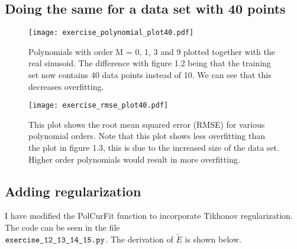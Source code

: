 \documentclass[paper=a4, fontsize=10pt]{scrartcl} %
\numberwithin{equation}{section} %
\numberwithin{figure}{section} %
\numberwithin{table}{section} %
\begin{document}
\subsection{Doing the same for a data set with 40 points}
\begin{figure}[H]
	\centering
	\texttt{[image: exercise\_polynomial\_plot40.pdf]}
	\caption{Polynomials with order M = 0, 1, 3 and 9 plotted together with the real sinusoid. The difference with figure 1.2 being that the training set now contains 40 data points instead of 10. We can see that this decreases overfitting.}
\end{figure}

\begin{figure}[H]
	\centering
	\texttt{[image: exercise\_rmse\_plot40.pdf]}
	\caption{This plot shows the root mean squared error (RMSE) for various polynomial orders. Note that this plot shows less overfitting than the plot in figure 1.3, this is due to the increased size of the data set. Higher order polynomials would result in more overfitting.}
\end{figure}

\subsection{Adding regularization}
I have modified the PolCurFit function to incorporate Tikhonov regularization.
The code can be seen in the file \\$\verb|exercise_12_13_14_15.py|$. The derivation of $\tilde{E}$ is shown below.
\end{document}
